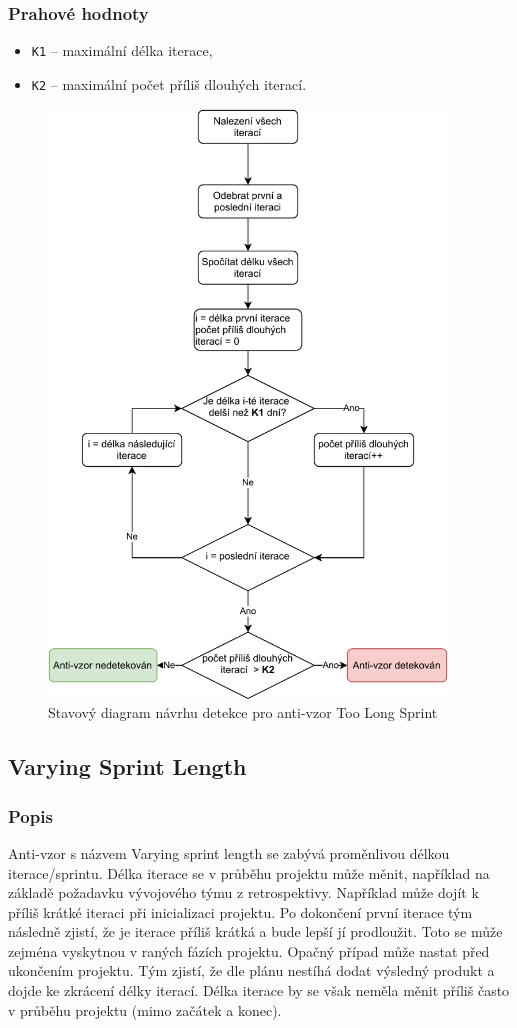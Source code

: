 \documentclass[czech,DP]{thesiskiv}
\begin{document}
\subsubsection{Prahové hodnoty}
\begin{itemize}
    \item \texttt{K1} -- maximální délka iterace,
    \item \texttt{K2} -- maximální počet příliš dlouhých iterací.
\end{itemize}
\begin{figure}[!htb]
    \centering
    \includegraphics[width=300pt]{img/too_long_sprint.pdf}
    \caption{Stavový diagram návrhu detekce pro anti-vzor Too Long Sprint}
    \label{img:too_long_sprint}
\end{figure}
\FloatBarrier
\subsection{Varying Sprint Length}
\subsubsection{Popis}
Anti-vzor s názvem Varying sprint length se zabývá proměnlivou délkou iterace/sprintu. Délka iterace se v průběhu projektu může měnit, například na základě požadavku vývojového týmu z retrospektivy. Například může dojít k příliš krátké iteraci při inicializaci projektu. Po dokončení první iterace tým následně zjistí, že je iterace příliš krátká a bude lepší jí prodloužit. Toto se může zejména vyskytnou v raných fázích projektu. Opačný případ může nastat před ukončením projektu. Tým zjistí, že dle plánu nestíhá dodat výsledný produkt a dojde ke zkrácení délky iterací. Délka iterace by se však neměla měnit příliš často v průběhu projektu (mimo začátek a konec). \cite{scrum_but_anti_patterns}
\end{document}
